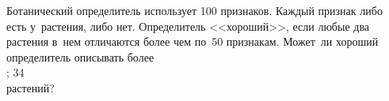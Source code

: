 \begin{problems}
\item
Ботанический определитель использует 100 признаков.
Каждый признак либо есть у~растения, либо нет.
Определитель <<хороший>>, если любые два растения в~нем отличаются более чем
по~50 признакам.
Может~ли хороший определитель описывать более
\\
;
\qquad
\subproblemx{*} 34
\\
растений?

\end{problems}


